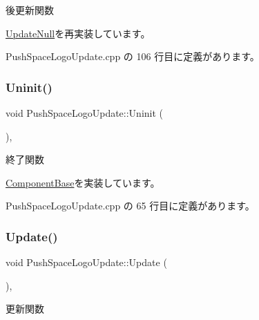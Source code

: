 後更新関数 



\mbox{\hyperlink{class_update_null_ac68da1ba7f3fbcae833442bb1c169200}{Update\+Null}}を再実装しています。



 Push\+Space\+Logo\+Update.\+cpp の 106 行目に定義があります。

\mbox{\label{class_push_space_logo_update_a94f791874cb6160cd33cd7068fcde0d0}} 
\subsubsection{\texorpdfstring{Uninit()}{Uninit()}}
{\footnotesize\ttfamily void Push\+Space\+Logo\+Update\+::\+Uninit (\begin{DoxyParamCaption}{ }\end{DoxyParamCaption})\hspace{0.3cm}{\ttfamily [override]}, {\ttfamily [virtual]}}



終了関数 



\mbox{\hyperlink{class_component_base_a9f42beaf0383d6f629819579cab4de57}{Component\+Base}}を実装しています。



 Push\+Space\+Logo\+Update.\+cpp の 65 行目に定義があります。

\mbox{\label{class_push_space_logo_update_aa07fe6f6f4f072e1f81bc6708dd4727e}} 
\subsubsection{\texorpdfstring{Update()}{Update()}}
{\footnotesize\ttfamily void Push\+Space\+Logo\+Update\+::\+Update (\begin{DoxyParamCaption}{ }\end{DoxyParamCaption})\hspace{0.3cm}{\ttfamily [override]}, {\ttfamily [virtual]}}



更新関数 



